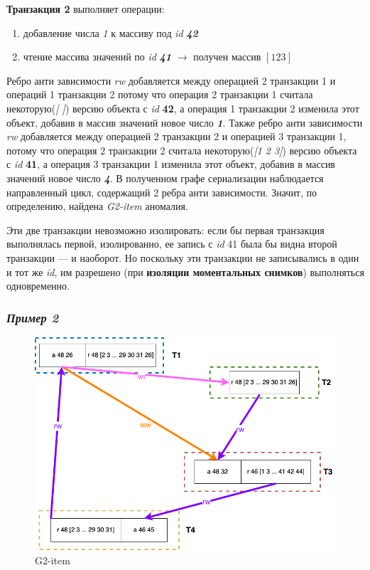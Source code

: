\documentclass[12pt,  openany]{book}
\begin{document}
\textbf{Транзакция 2} выполняет операции:
\begin{enumerate}
\item добавление числа \textit{1} к массиву под \textit{id} \textit{\textbf{42}}
\item чтение массива значений по \textit{id} \textit{\textbf{41}} $\rightarrow$ получен массив $[1 2 3]$
\end{enumerate}

Ребро анти зависимости \textit{rw} добавляется между операцией 2 транзакции 1 и операций 1 транзакции 2 потому что операция 2 транзакции 1  считала некоторую(\textit{[ ]}) версию объекта с \textit{id} \textbf{42},  а операция 1 транзакции 2 изменила этот объект, добавив в массив значений новое число \textit{\textbf{1}}.  Также ребро анти зависимости \textit{rw} добавляется между операцией 2 транзакции 2 и операцией 3 транзакции 1, потому что операция 2 транзакции 2  считала некоторую(\textit{[1 2 3]}) версию объекта с \textit{id} \textbf{41},  а операция 3 транзакции 1 изменила этот объект, добавив в массив значений новое число \textit{\textbf{4}}.  В полученном графе сериализации наблюдается направленный цикл, содержащий 2 ребра анти зависимости. Значит, по определению, найдена \textit{G2-item} аномалия.

\par Эти две транзакции невозможно изолировать: если бы первая транзакция выполнялась первой, изолированно, ее запись с \textit{id} 41 была бы видна второй транзакции --- и наоборот. Но поскольку эти транзакции не записывались в один и тот же \textit{id}, им разрешено (при \textbf{изоляции моментальных снимков}) выполняться одновременно.

\subsubsection{\textit{Пример 2}}
\begin{figure}[H]
  \includegraphics[width=\textwidth]{images/g2item2.png}
  \caption{G2-item}
\end{figure}
\end{document}
